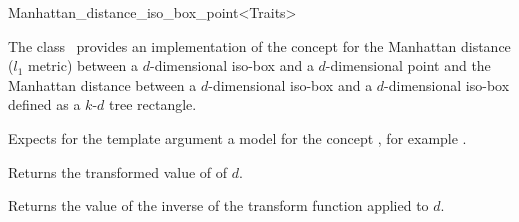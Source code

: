 

\begin{ccRefClass}{Manhattan_distance_iso_box_point<Traits>}  %


\ccDefinition
  
The class \ccRefName\ provides an implementation of
the  concept
for the Manhattan distance ($l_1$ metric)
between a $d$-dimensional iso-box and a $d$-dimensional point 
and the Manhattan distance between a $d$-dimensional iso-box
and a $d$-dimensional iso-box defined as a $k$-$d$ tree rectangle.


\ccParameters
Expects for the template argument a model for the concept
, for example .


\ccIsModel


\ccTypes


\ccCreation
{}  %


\ccOperations


 {Returns the transformed value of of $d$.}

 {Returns the value of the inverse 
                                                      of the transform function applied to $d$.}


\end{ccRefClass}
